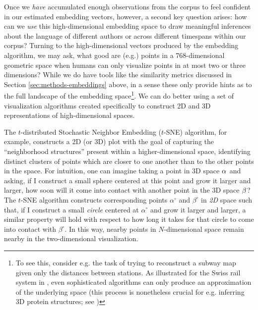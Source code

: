 \documentclass[11pt]{article}
\begin{document}
Once we \textit{have} accumulated enough observations from the corpus to feel confident in our estimated embedding vectors, however, a second key question arises: how can we \textit{use} this high-dimensional embedding space to draw meaningful inferences about the language of different authors or across different timespans within our corpus? Turning to the high-dimensional vectors produced by the embedding algorithm, we may ask, what good are (e.g.) points in a 768-dimensional geometric space when humans can only visualize points in at most two or three dimensions? While we do have tools like the similarity metrics discussed in Section \ref{sec:methods-embeddings} above, in a sense these only provide hints as to the full landscape of the embedding space\footnote{To see this, consider e.g. the task of trying to reconstruct a subway map given only the distances between stations. As illustrated for the Swiss rail system in \cite{dokmanic_euclidean_2015}, even sophisticated algorithms can only produce an approximation of the underlying space (this process is nonetheless crucial for e.g. inferring 3D protein structures; see \cite{vendruscolo_recovery_1997})}. We can do better using a set of visualization algorithms created specifically to construct 2D and 3D representations of high-dimensional spaces.

The $t$-distributed Stochastic Neighbor Embedding ($t$-SNE) algorithm, for example, constructs a 2D (or 3D) plot with the goal of capturing the ``neighborhood structures'' present within a higher-dimensional space, identifying distinct clusters of points which are closer to one another than to the other points in the space. For intuition, one can imagine taking a point in 3D space $\alpha\text{\textsuperscript{}}$ and asking, if I construct a small sphere centered at this point and grow it larger and larger, how soon will it come into contact with another point in the 3D space $\beta\text{\textsuperscript{}}$? The $t$-SNE algorithm constructs corresponding points $\alpha^\circ$ and $\beta^\circ$ in \textit{2D} space such that, if I construct a small \textit{circle} centered at $\alpha^\circ$ and grow it larger and larger, a similar property will hold with respect to how long it takes for that circle to come into contact with $\beta^\circ$. In this way, nearby points in $N$-dimensional space remain nearby in the two-dimensional visualization.
\end{document}

